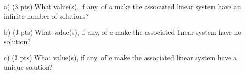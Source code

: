 \documentclass{article}
\begin{document}
\begin{flushleft}
a) (3 pts) What value(s), if any, of $a$ make the associated linear system have an infinite number of solutions?

\vspace{1.5in}

b) (3 pts) What value(s), if any, of $a$ make the associated linear system have no solution?

\vspace{1.5in}

c) (3 pts) What value(s), if any, of $a$ make the associated linear system have a unique solution?

\end{flushleft}
\end{document}
